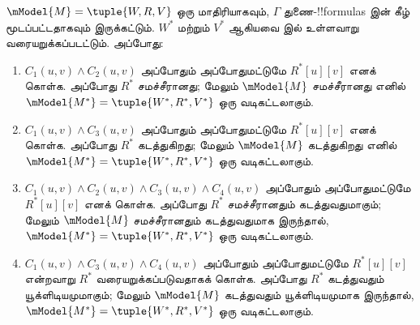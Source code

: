 \documentclass[../../../include/open-logic-section]{subfiles}
\begin{document}
\begin{thm}
  $\mModel{M} =\tuple{W,R,V}$ ஒரு மாதிரியாகவும், $\Gamma$ துணை-!!{formula}s
  இன் கீழ் மூடப்பட்டதாகவும் இருக்கட்டும். $W^*$ மற்றும் $V^*$ ஆகியவை
   இல் உள்ளவாறு வரையறுக்கப்படட்டும். அப்போது:
  \begin{enumerate}
  \item $C_1(u, v) \land C_2(u,v)$ அப்போதும் அப்போதுமட்டுமே
    $R^*[u][v]$ எனக் கொள்க. அப்போது $R^*$ சமச்சீரானது; மேலும்
    $\mModel{M}$ சமச்சீரானது எனில்
    $\mModel{M^*} = \tuple{W^*,R^*,V^*}$ ஒரு வடிகட்டலாகும்.
  \item $C_1(u, v) \land C_3(u,v)$ அப்போதும் அப்போதுமட்டுமே
    $R^*[u][v]$ எனக் கொள்க. அப்போது $R^*$ கடத்துகிறது; மேலும்
    $\mModel{M}$ கடத்துகிறது எனில்
    $\mModel{M^*}=\tuple{W^*,R^*,V^*}$ ஒரு வடிகட்டலாகும்.
  \item $C_1(u, v) \land C_2(u,v) \land C_3(u,v) \land C_4(u,v)$
    அப்போதும் அப்போதுமட்டுமே $R^*[u][v]$ எனக் கொள்க. அப்போது $R^*$
    சமச்சீரானதும் கடத்துவதுமாகும்; மேலும் $\mModel{M}$ சமச்சீரானதும்
    கடத்துவதுமாக இருந்தால், $\mModel{M^*}=\tuple{W^*,R^*,V^*}$ ஒரு
    வடிகட்டலாகும்.
  \item $C_1(u, v) \land C_3(u,v) \land C_4(u,v)$ அப்போதும்
    அப்போதுமட்டுமே $R^*[u][v]$ என்றவாறு $R^*$ வரையறுக்கப்படுவதாகக்
    கொள்க. அப்போது $R^*$ கடத்துவதும் யூக்ளிடியமுமாகும்; மேலும்
    $\mModel{M}$ கடத்துவதும் யூக்ளிடியமுமாக இருந்தால்,
    $\mModel{M^*}=\tuple{W^*,R^*,V^*}$ ஒரு வடிகட்டலாகும்.
  \end{enumerate}
\end{thm}
\end{document}
